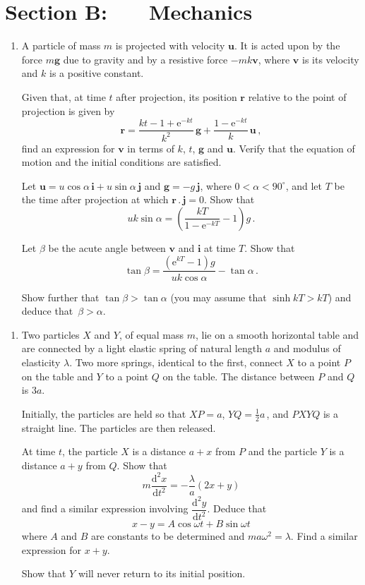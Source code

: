 \documentclass[a4, 11pt]{report}
\newlength{\qspace}
\newcounter{qnumber}
\newenvironment{question}%
 {\vspace{\qspace}
  \begin{enumerate}[\bfseries 1\quad][10]%
    \setcounter{enumi}{\value{qnumber}}%
    \item%
 }
{
  \end{enumerate}
  \filbreak
  \stepcounter{qnumber}
 }
\renewcommand{\.}[1]{\ensuremath{\mathrm{#1}}}
\newcommand{\+}[1]{\ensuremath{\mathbf{#1}}}
\begin{document}
		
	
\newpage
\section*{Section B: \ \ \ Mechanics}


	
\begin{question}
  A particle of mass $m$ is projected with velocity $\+ u$. It is
  acted upon by the force $m\+g$ due to gravity and by a resistive
  force $-mk \+v$, where $\+v$ is its velocity and $k$ is a positive
  constant.

  Given that, at time $t$ after projection, its position $\+r$
  relative to the point of projection is given by
  \[
  \+r = \frac{kt -1 +\.e^{-kt}} {k^2} \, \+g + \frac{ 1-\.e^{-kt}}{k}
  \, \+u \,,
  \]
  find an expression for $\+v$ in terms of $k$, $t$, $\+g$ and
  $\+u$. Verify that the equation of motion and the initial conditions
  are satisfied.

  Let $\+u = u\cos\alpha \, \+i + u \sin\alpha \, \+j$ and $\+g = -g\,
  \+j$, where $0<\alpha<90^\circ$, and let $T$ be the time after projection at
  which $\+r \,.\, \+j =0$. Show that
  \[
  uk \sin\alpha = \left(\frac{kT}{1-\.e^{-kT}} -1\right)g\,.
  \]

  Let $\beta$ be the acute angle between $\+v$ and $\+i$ at time
  $T$. Show that
  \[
  \tan\beta = \frac{(\.e^{kT}-1)g}{uk\cos\alpha}-\tan\alpha \,.
  \]

  Show further that $\tan\beta >\tan\alpha$ (you may assume that
 $\sinh kT >kT$) and deduce that~$\beta >\alpha$.
	\end{question}
	
\begin{question}	
Two particles $X$ and $Y$, of equal mass $m$, lie on a
smooth horizontal table and are connected by a 
light elastic spring of natural
length $a$ and modulus of elasticity $\lambda$.  Two more springs,
identical to the first, 
connect 
$X$ to a point $P$ on the table and 
$Y$  
to a point $Q$ on the table. The distance between $P$ and $Q$ is $3a$.


  Initially, the particles are held so that $XP=a$,     
$YQ= \frac12 a\,$, and $PXYQ$ is a straight line. 
   The particles are then released.

  At time $t$, the particle $X$ is a distance $a+x$ from $P$ and the
  particle $Y$ is a distance $a+y$ from $Q$.  Show that
  \[
  m \frac{\.d ^2 x}{\.d t^2} = -\frac\lambda a (2x+y)
  \]
  and find a similar expression involving $\dfrac{\.d^2 y}{\.d t^2}$.
  Deduce that
  \[
  x-y = A\cos \omega t +B \sin\omega t
  \]
  where $A$ and $B$ are constants to be determined and
  $ma\omega^2=\lambda$.  Find a similar expression for $x+y$.

  Show that $Y$ will never return to its initial position.
\end{question}
\end{document}
